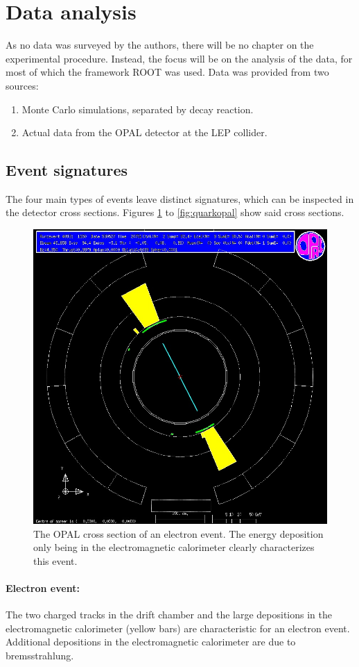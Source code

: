 \section{Data analysis}
As no data was surveyed by the authors, there will be no chapter on the experimental procedure. Instead, the focus will be on the analysis of the data, for most of which the framework ROOT was used. Data was provided from two sources:
\begin{enumerate}
	\item Monte Carlo simulations, separated by decay reaction.
	\item Actual data from the OPAL detector at the LEP collider.
\end{enumerate}

\subsection{Event signatures}
The four main types of events leave distinct signatures, which can be inspected in the detector cross sections. Figures \ref{fig:electronopal} to \ref{fig:quarkopal} show said cross sections. 

\begin{figure}[H]
\centering
\includegraphics[width=0.75\linewidth]{graphics/electronopal}
\caption[OPAL cross secion electron event]{The OPAL cross section of an electron event. The energy deposition only being in the electromagnetic calorimeter clearly characterizes this event. \cite{cern}}
\label{fig:electronopal}
\end{figure}
\paragraph{Electron event:} The two charged tracks in the drift chamber and the large depositions in the electromagnetic calorimeter (yellow bars) are characteristic for an electron event. Additional depositions in the electromagnetic calorimeter are due to bremsstrahlung.

